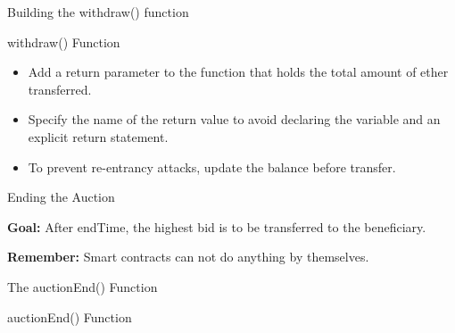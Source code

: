 \documentclass[handout]{beamer}
\begin{document}
\begin{frame}{Building the withdraw() function}

\begin{samplecode}{withdraw() Function}
	
\end{samplecode}

\begin{itemize}
	\item 	Add a return parameter to the function that holds the total amount of ether transferred.
	\item<2-> 	Specify the name of the return value to avoid declaring the variable and an explicit return statement. 
	\item<3->	To prevent re-entrancy attacks, update the balance \color{focus}before \color{black} transfer.
\end{itemize}

\end{frame}

\begin{frame}{Ending the Auction}

\textbf{Goal:} After endTime, the highest bid is to be transferred to the beneficiary.

\vspace{1.5em}

\textbf{Remember:} Smart contracts can not do anything by themselves.


\end{frame}

\begin{frame}{The auctionEnd() Function}


\begin{samplecode}{auctionEnd() Function}
	
\end{samplecode}

\end{frame}
\end{document}
